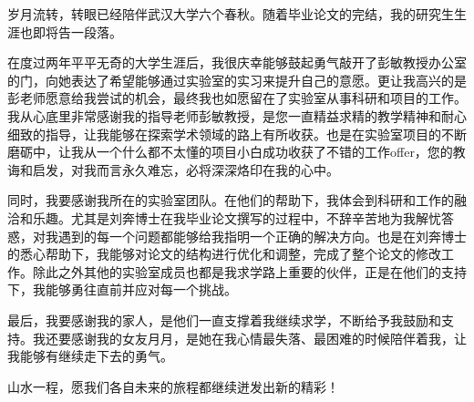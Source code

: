 
岁月流转，转眼已经陪伴武汉大学六个春秋。随着毕业论文的完结，我的研究生生涯也即将告一段落。

在度过两年平平无奇的大学生涯后，我很庆幸能够鼓起勇气敲开了彭敏教授办公室的门，向她表达了希望能够通过实验室的实习来提升自己的意愿。更让我高兴的是彭老师愿意给我尝试的机会，最终我也如愿留在了实验室从事科研和项目的工作。我从心底里非常感谢我的指导老师彭敏教授，是您一直精益求精的教学精神和耐心细致的指导，让我能够在探索学术领域的路上有所收获。也是在实验室项目的不断磨砺中，让我从一个什么都不太懂的项目小白成功收获了不错的工作offer，您的教诲和启发，对我而言永久难忘，必将深深烙印在我的心中。

同时，我要感谢我所在的实验室团队。在他们的帮助下，我体会到科研和工作的融洽和乐趣。尤其是刘奔博士在我毕业论文撰写的过程中，不辞辛苦地为我解忧答惑，对我遇到的每一个问题都能够给我指明一个正确的解决方向。也是在刘奔博士的悉心帮助下，我能够对论文的结构进行优化和调整，完成了整个论文的修改工作。除此之外其他的实验室成员也都是我求学路上重要的伙伴，正是在他们的支持下，我能够勇往直前并应对每一个挑战。

最后，我要感谢我的家人，是他们一直支撑着我继续求学，不断给予我鼓励和支持。我还要感谢我的女友月月，是她在我心情最失落、最困难的时候陪伴着我，让我能够有继续走下去的勇气。

山水一程，愿我们各自未来的旅程都继续迸发出新的精彩！
